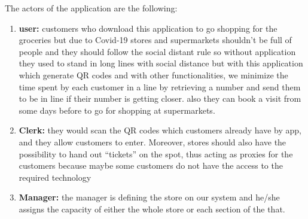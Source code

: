 The actors of the application are the following:

\begin{enumerate}
\item \textbf{user:} customers who download this application to go shopping for the groceries but due to Covid-19 stores and supermarkets shouldn't be full of people and they should follow the social distant rule so without application they used to stand in long lines with social distance but with this application which generate QR codes and with other functionalities, we minimize the time spent by each customer in a line by retrieving a number and send them to be in line if their number is getting closer. also they can book a visit from some days before to go for shopping at supermarkets.

\item \textbf{Clerk:} they would scan the QR codes which customers already have by app, and they allow customers to enter. Moreover, stores should also have the possibility to hand out “tickets” on the spot, thus acting as proxies for the customers because maybe some customers do not have the  access to the required technology

\item \textbf{Manager:} the manager is defining the store on our system and he/she assigns the capacity of either the whole store or each section of the that.
\end{enumerate}